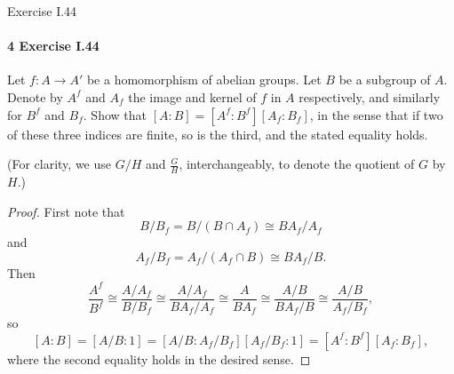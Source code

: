 \documentclass[12pt]{article}
\newlength{\myparskip}
\newenvironment{fullbox}{\begin{lrbox}{\savefullbox}\begin{minipage}{\dimexpr\textwidth-2\fboxsep\relax}\setlength{\parskip}{\myparskip}}{\end{minipage}\end{lrbox}\framebox[\textwidth]{\usebox{\savefullbox}}}
\newenvironment{pbox}[1][]{\begin{fullbox}\ifx#1\empty\else\paragraph{#1}\fi}{\end{fullbox}}
\newcommand{\<}{\langle}
\renewcommand{\>}{\rangle}
\newcommand{\isom}{\cong}
\begin{document}
\newpage
\begin{pbox}[4 Exercise I.44]
    Let $f : A \to A'$ be a homomorphism of abelian groups. Let $B$ be a subgroup of $A$. Denote by $A^f$ and $A_f$ the image and kernel of $f$ in $A$ respectively, and similarly for $B^f$ and $B_f$. Show that $[A : B] = [A^f : B^f][A_f : B_f]$, in the sense that if two of these three indices are finite, so is the third, and the stated equality holds.
\end{pbox}

(For clarity, we use $G/H$ and $\frac{G}{H}$, interchangeably, to denote the quotient of $G$ by $H$.)

\begin{proof}
    First note that
    \[
        B/B_f
            = B/(B \cap A_f)
            \isom BA_f/A_f
    \]
    and
    \[
        A_f/B_f
            = A_f/(A_f \cap B)
            \isom BA_f/B.
    \]
    Then
    \[
        \frac{A^f}{B^f}
            \isom \frac{A/A_f}{B/B_f}
            \isom \frac{A/A_f}{BA_f/A_f}
            \isom \frac{A}{BA_f}
            \isom \frac{A/B}{BA_f/B}
            \isom \frac{A/B}{A_f/B_f},
    \]
    so
    \[
        [A : B]
            = [A/B : 1]
            = [A/B : A_f/B_f][A_f/B_f : 1]
            = [A^f : B^f][A_f : B_f],
    \]
    where the second equality holds in the desired sense.


\end{proof}
\end{document}
